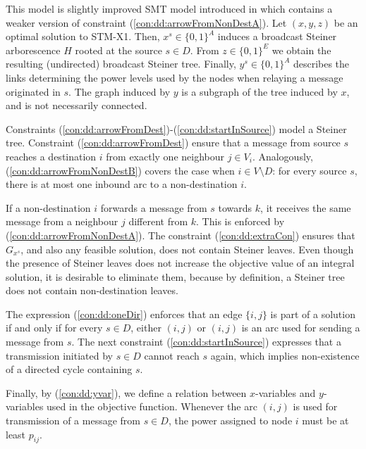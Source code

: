 This model is slightly improved SMT model introduced in \cite{ivanova16isco} which contains a weaker version of constraint (\ref{con:dd:arrowFromNonDestA}).  
Let $(x,y,z)$ be an optimal solution to STM-X1. Then, $x^s\in \{0,1\}^{A}$ induces a broadcast Steiner arborescence $H$ rooted at the source $s\in D$. From $z\in \{0,1\}^E$ we obtain the resulting (undirected) broadcast Steiner tree. Finally, $y^s\in \{0,1\}^{A}$ describes the links determining the power levels used by the nodes when relaying a message originated in $s$. The graph induced by $y$ is  a subgraph of the tree induced by $x$, and is not necessarily connected.

Constraints (\ref{con:dd:arrowFromDest})-(\ref{con:dd:startInSource}) model a Steiner tree. Constraint (\ref{con:dd:arrowFromDest}) ensure that a message from source $s$ reaches a destination $i$ from exactly one neighbour $j\in V_i$. Analogously, (\ref{con:dd:arrowFromNonDestB}) covers the case when $i \in V\setminus D$: for every source $s$, there is at most one inbound arc to a non-destination $i$. 

If a non-destination $i$ forwards a message from $s$ towards $k$, it receives the same message from a neighbour $j$ different from $k$. This is enforced by (\ref{con:dd:arrowFromNonDestA}). 
The constraint (\ref{con:dd:extraCon}) ensures that $G_{x^s}$, and also any feasible solution, does not contain Steiner leaves. Even though the presence of Steiner leaves does not increase the objective value of an integral solution, it is desirable to eliminate them, because by definition, a Steiner tree does not contain non-destination leaves.

The expression (\ref{con:dd:oneDir}) enforces that an edge $\{i,j\}$ is part of a solution if and only if for every $s\in D$, either $(i,j)$ or $(i,j)$ is an arc used for sending a message from $s$. The next constraint (\ref{con:dd:startInSource}) expresses that a transmission initiated by $s\in D$ cannot reach $s$ again, which implies non-existence of a directed cycle containing $s$. 

Finally, by (\ref{con:dd:yvar}), we define a relation between $x$-variables and $y$-variables used in the objective function. Whenever the arc $(i,j)$ is used for transmission of a message from $s\in D$, the power assigned to node $i$ must be at least $p_{ij}$.
